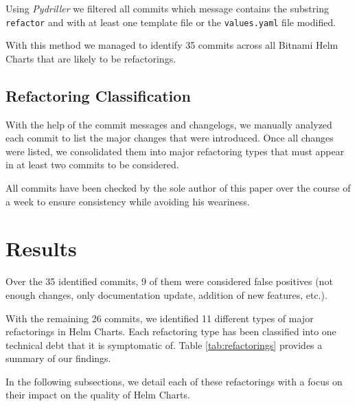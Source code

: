 \documentclass[conference]{IEEEtran}
\begin{document}
Using \textit{Pydriller} \cite{Spadini2018} we filtered all commits which message contains the substring \texttt{refactor} and with at least one template file or the \texttt{values.yaml} file modified.

With this method we managed to identify 35 commits across all Bitnami Helm Charts that are likely to be refactorings.

\subsection{Refactoring Classification}

With the help of the commit messages and changelogs, we manually analyzed each commit to list the major changes that were introduced. Once all changes were listed, we consolidated them into major refactoring types that must appear in at least two commits to be considered.

All commits have been checked by the sole author of this paper over the course of a week to ensure consistency while avoiding his weariness.

\section{Results}

Over the 35 identified commits, 9 of them were considered false positives (not enough changes, only documentation update, addition of new features, etc.).

With the remaining 26 commits, we identified 11 different types of major refactorings in Helm Charts. Each refactoring type has been classified into one technical debt that it is symptomatic of. Table \ref{tab:refactorings} provides a summary of our findings.

In the following subsections, we detail each of these refactorings with a focus on their impact on the quality of Helm Charts.
\end{document}
